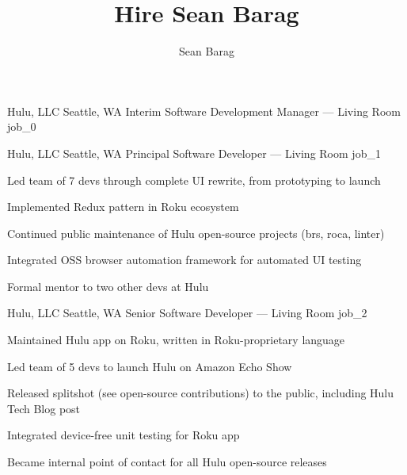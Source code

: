 \documentclass[10pt]{barag_resume}
\title{Hire Sean Barag}
\author{Sean Barag}
\begin{document}
\relax
    \renewcommand{\labelitemi}{$\cdot$}\relax %
    \begin{job}{Hulu, LLC}
        {Seattle, WA}
        {Interim Software Development Manager --- Living Room}
        {job_0}
    \end{job}

    \begin{job}{Hulu, LLC}
        {Seattle, WA}
        {Principal Software Developer --- Living Room}
        {job_1}
            \begin{itemize*}
                \item Led team of 7 devs through complete UI rewrite, from prototyping to launch
                \item Implemented Redux pattern in Roku ecosystem
                \item Continued public maintenance of Hulu open-source projects (brs, roca, linter)
                \item Integrated OSS browser automation framework for automated UI testing
                \item Formal mentor to two other devs at Hulu
            \end{itemize*}
    \end{job}

    \begin{job}{Hulu, LLC}
        {Seattle, WA}
        {Senior Software Developer --- Living Room}
        {job_2}
            \begin{itemize*}
                \item Maintained Hulu app on Roku, written in Roku-proprietary language
                \item Led team of 5 devs to launch Hulu on Amazon Echo Show
                \item Released splitshot (see open-source contributions) to the public, including Hulu Tech Blog post
                \item Integrated device-free unit testing for Roku app
                \item Became internal point of contact for all Hulu open-source releases
            \end{itemize*}
    \end{job}
\end{document}
